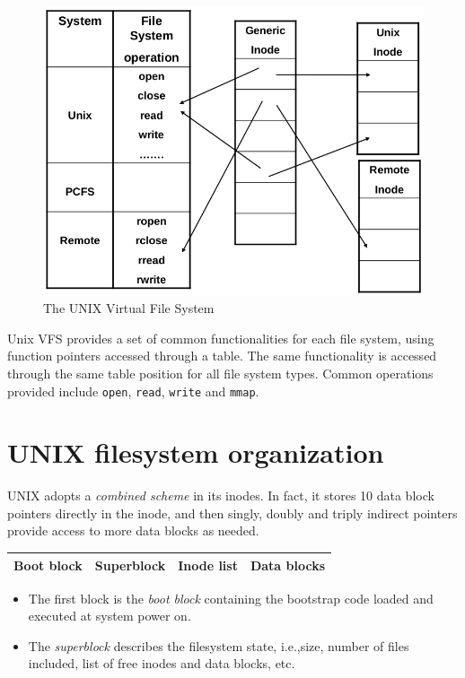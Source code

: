 \begin{figure}[hbtp]
\centering
\includegraphics[scale=0.35]{images/file_system/virtual_file_system.png}
\caption{The UNIX Virtual File System}
\end{figure}

Unix VFS provides a set of common functionalities for each file system, using function pointers
accessed through a table. The same functionality is accessed through the same table position for
all file system types. Common operations provided include \texttt{open}, \texttt{read}, \texttt{write} and \texttt{mmap}.

\section{UNIX filesystem organization}
UNIX adopts a \emph{combined scheme} in its inodes. In fact, it stores 10 data block pointers directly in the inode, and then singly, doubly and triply indirect pointers provide access to more data blocks as needed.

\begin{center}
\begin{tabular}{|c|c|c|c|}
\hline 
Boot block & Superblock & Inode list & Data blocks \\ 
\hline 
\end{tabular} 
\end{center}

\begin{itemize}
\item The first block is the \emph{boot block} containing the bootstrap code loaded and executed at system power on.
\item The \emph{superblock} describes the filesystem state, i.e.,\@ size, number of files included, list of free inodes and data blocks, etc.
\end{itemize}

